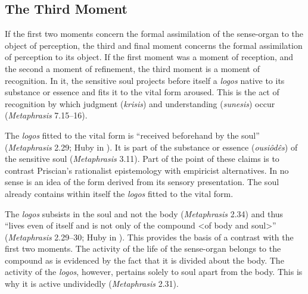 \documentclass[12pt]{article}
\begin{document}

\subsection{The Third Moment} %
\label{sub:the_third_moment}

If the first two moments concern the formal assimilation of the sense-organ to the object of perception, the third and final moment concerns the formal assimilation of perception to its object. If the first moment was a moment of reception, and the second a moment of refinement, the third moment is a moment of recognition. In it, the sensitive soul projects before itself a \emph{logos} native to its substance or essence and fits it to the vital form aroused. This is the act of recognition by which judgment (\emph{krisis}) and understanding (\emph{sunesis}) occur (\emph{Metaphrasis} 7.15--16).

The \emph{logos} fitted to the vital form is ``received beforehand by the soul'' (\emph{Metaphrasis} 2.29; Huby in \citealt[10]{Sorabji:1997ly}). It is part of the substance or essence (\emph{ousiôdês}) of the sensitive soul (\emph{Metaphrasis} 3.11). Part of the point of these claims is to contrast Priscian's rationalist epistemology with empiricist alternatives. In no sense is an idea of the form derived from its sensory presentation. The soul already contains within itself the \emph{logos} fitted to the vital form.

The \emph{logos} subsists in the soul and not the body (\emph{Metaphrasis} 2.34) and thus ``lives even of itself and is not only of the compound <of body and soul>'' (\emph{Metaphrasis} 2.29--30; Huby in \citealt[10]{Sorabji:1997ly}). This provides the basis of a contrast with the first two moments. The activity of the life of the sense-organ belongs to the compound as is evidenced by the fact that it is divided about the body. The activity of the \emph{logos}, however, pertains solely to soul apart from the body. This is why it is active undividedly (\emph{Metaphrasis} 2.31).
\end{document}
